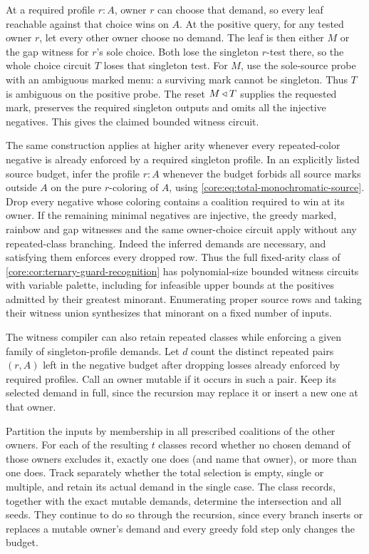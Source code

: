 At a required profile $r:A$, owner $r$
can choose that demand, so every leaf
reachable against that choice wins on $A$.
At the positive query, for any tested owner
$r$, let every other owner choose no
demand. The leaf is then either $M$ or
the gap witness for $r$'s sole choice.
Both lose the singleton $r$-test there,
so the whole choice circuit $T$ loses
that singleton test. For $M$, use the
sole-source probe with an ambiguous marked
menu: a surviving mark cannot be singleton.
Thus $T$ is ambiguous on the positive
probe. The reset $M\mathbin{\triangleleft} T$ supplies the
requested mark, preserves the required
singleton outputs and omits all the
injective negatives. This gives the
claimed bounded witness circuit.

The same construction applies at higher arity
whenever every repeated-color negative is
already enforced by a required singleton
profile. In an explicitly listed source
budget, infer the profile $r:A$ whenever
the budget forbids all source marks outside
$A$ on the pure $r$-coloring of $A$, using
\cref{core:eq:total-monochromatic-source}.
Drop every negative whose coloring contains
a coalition required to win at its owner.
If the remaining minimal negatives are
injective, the greedy marked, rainbow and
gap witnesses and the same owner-choice
circuit apply without any repeated-class
branching. Indeed the inferred demands are
necessary, and satisfying them enforces
every dropped row. Thus the full
fixed-arity class of
\cref{core:cor:ternary-guard-recognition}
has polynomial-size bounded witness
circuits with variable palette, including
for infeasible upper bounds at the
positives admitted by their greatest
minorant. Enumerating proper source rows
and taking their witness union synthesizes
that minorant on a fixed number of inputs.

The witness compiler can also retain repeated
classes while enforcing a given family of
singleton-profile demands. Let $d$ count the
distinct repeated pairs $(r,A)$ left in the
negative budget after dropping losses already
enforced by required profiles. Call an owner
mutable if it occurs in such a pair. Keep its
selected demand in full, since the recursion
may replace it or insert a new one at that owner.

Partition the inputs by membership in all
prescribed coalitions of the other owners.
For each of the resulting $t$ classes record
whether no chosen demand of those owners
excludes it, exactly one does (and name that
owner), or more than one does. Track separately
whether the total selection is empty, single
or multiple, and retain its actual demand in
the single case. The class records, together
with the exact mutable demands, determine the
intersection and all seeds. They continue to
do so through the recursion, since every
branch inserts or replaces a mutable owner's
demand and every greedy fold step only changes
the budget.

